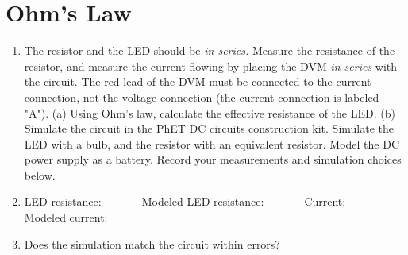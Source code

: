 \documentclass{article}
\begin{document}
\section{Ohm's Law}

\begin{enumerate}
\item The resistor and the LED should be \textit{in series.}  Measure the resistance of the resistor, and measure the current flowing by placing the DVM \textit{in series} with the circuit.  The red lead of the DVM must be connected to the current connection, not the voltage connection (the current connection is labeled "A").  (a) Using Ohm's law, calculate the effective resistance of the LED. (b) Simulate the circuit in the PhET DC circuits construction kit.  Simulate the LED with a bulb, and the resistor with an equivalent resistor.  Model the DC power supply as a battery.  Record your measurements and simulation choices below. \\ \vspace{3cm}
\item LED resistance:$~~~~~~~~~~~~~~~$ Modeled LED resistance:$~~~~~~~~~~~~~~~$          Current:$~~~~~~~~~~~~~~~$          Modeled current:$~~~~~~~~~~~~~~~$
\item Does the simulation match the circuit within errors?
\end{enumerate}
\end{document}
